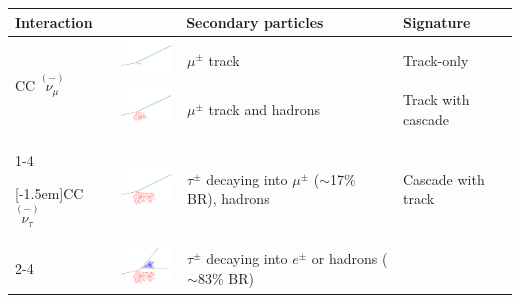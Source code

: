 \begin{table}[h]
    \small
    \begin{center}
        \begin{tabular}{ m{1.8cm} m{2.0cm} m{3.0cm} m{1.8cm} }

            \hline\hline

            \textbf{Interaction} & \multicolumn{2}{c}{\textbf{Secondary particles}} &\textbf{Signature} \\

            \hline\hline

            \multirow{2}{*}[-1.5em]{CC $\overset{(-)}{\nu_\mu}$ }
            & \includegraphics[width=2cm]{figures/neutrinos_properties/interaction_schematics/numu_CC_muon_only.pdf} 
            & $\mu^\pm$ track 
            & Track-only \\

            \cmidrule{2-4} 
            &\includegraphics[width=2cm]{figures/neutrinos_properties/interaction_schematics/numu_CC_track_cascade.pdf}  
            & $\mu^\pm$ track and hadrons 
            & Track with cascade \\


            \cmidrule{1-4}

            \multirow{2}{*}[-1.5em]{CC $\overset{(-)}{\nu_\tau}$ }
            &\includegraphics[width=2cm]{figures/neutrinos_properties/interaction_schematics/nutau_CC_track_cascade.pdf} 
            & $\tau^\pm$ decaying into $\mu^\pm$ ($\sim$17\% BR), hadrons 
            & Cascade with track \\

            \cmidrule{2-4}

            & \includegraphics[width=2cm]{figures/neutrinos_properties/interaction_schematics/nutau_CC_cascadeonly.pdf}
            & $\tau^\pm$ decaying into $e^\pm$ or hadrons ($\sim$83\% BR)  
            & {} \\


\end{tabular}
\end{center}
\end{table}
